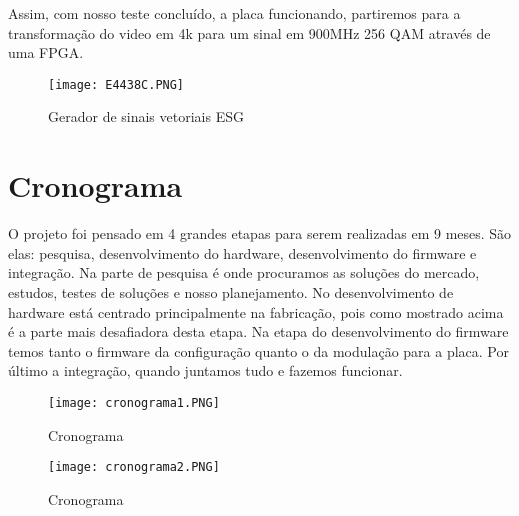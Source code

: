 Assim, com nosso teste concluído, a placa funcionando, partiremos para a transformação do video em 4k para um sinal em 900MHz 256 QAM através de uma FPGA.

\begin{figure}[htbp]
            \centering
            \caption{Gerador de sinais vetoriais ESG}
            \texttt{[image: E4438C.PNG]}
            
            \centering
            \label{E4438C}
        \end{figure}

\section{Cronograma}

O projeto foi pensado em 4 grandes etapas para serem realizadas em 9 meses. São elas: pesquisa, desenvolvimento do hardware, desenvolvimento do firmware e integração. Na parte de pesquisa é onde procuramos as soluções do mercado, estudos, testes de soluções e nosso planejamento. No desenvolvimento de hardware está centrado principalmente na fabricação, pois como mostrado acima é a parte mais desafiadora desta etapa. Na etapa do desenvolvimento do firmware temos tanto o firmware da configuração quanto o da modulação para a placa. Por último a integração, quando juntamos tudo e fazemos funcionar.

\begin{figure}[htbp]
            \centering
            \caption{Cronograma}
            \texttt{[image: cronograma1.PNG]}
            
            \centering
            \label{Cronograma}
        \end{figure}

\begin{figure}[htbp]
            \centering
            \caption{Cronograma}
            \texttt{[image: cronograma2.PNG]}
            
            \centering
            \label{cronograma2}
        \end{figure}